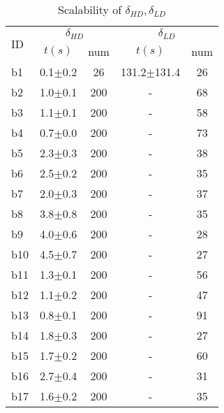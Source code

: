 \begin{longtable}{|l|c|c|c|c|}
\caption{\label{tab:distances}{Scalability of $\delta_{HD}, \delta_{LD}$}}\\
\hline
\multirow{2}{*}{ID}&\multicolumn{2}{c|}{$\delta_{HD}$}&\multicolumn{2}{c|}{$\delta_{LD}$}\\
\cline{2-5}
&$t(s)$&num&$t(s)$&num\\
\hline
b1&0.1$\pm$0.2 & 26&131.2$\pm$131.4 & 26
\\
b2&1.0$\pm$0.1 & 200 &- & 68
\\
b3&1.1$\pm$0.1 & 200 &- & 58
\\
b4&0.7$\pm$0.0 & 200 &- & 73
\\
b5&2.3$\pm$0.3 & 200 &- & 38
\\
b6&2.5$\pm$0.2 & 200 &- & 35
\\
b7&2.0$\pm$0.3 & 200 &- & 37
\\
b8&3.8$\pm$0.8 & 200 &- & 35
\\
b9&4.0$\pm$0.6 & 200 &- & 28
\\
b10&4.5$\pm$0.7 & 200 &- & 27
\\
b11&1.3$\pm$0.1 & 200 &- & 56
\\
b12&1.1$\pm$0.2 & 200 &- & 47
\\
b13&0.8$\pm$0.1 & 200 &- & 91
\\
b14&1.8$\pm$0.3 & 200 &- & 27
\\
b15&1.7$\pm$0.2 & 200 &- & 60
\\
b16&2.7$\pm$0.4 & 200 &- & 31
\\
b17&1.6$\pm$0.2 & 200 &- & 35
\\
\hline
\end{longtable}
